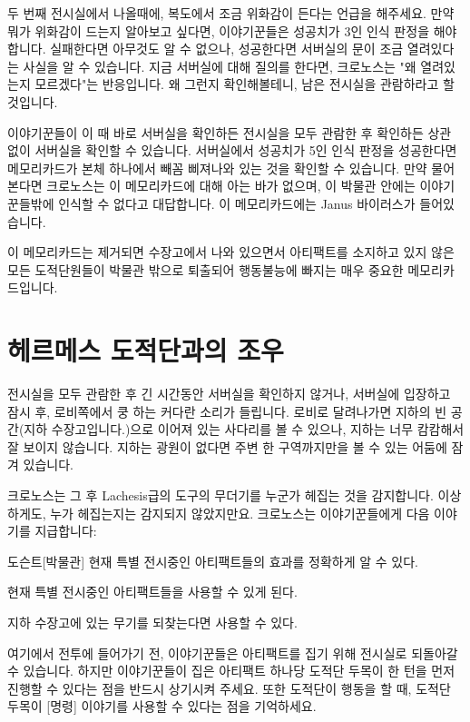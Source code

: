 \documentclass{report}
\begin{document}
	두 번째 전시실에서 나올때에, 복도에서 조금 위화감이 든다는 언급을 해주세요. 만약 뭐가 위화감이 드는지 알아보고 싶다면, 이야기꾼들은 성공치가 3인 인식 판정을 해야합니다. 실패한다면 아무것도 알 수 없으나, 성공한다면 서버실의 문이 조금 열려있다는 사실을 알 수 있습니다. 지금 서버실에 대해 질의를 한다면, 크로노스는 "왜 열려있는지 모르겠다"는 반응입니다. 왜 그런지 확인해볼테니, 남은 전시실을 관람하라고 할 것입니다.
	
	이야기꾼들이 이 때 바로 서버실을 확인하든 전시실을 모두 관람한 후 확인하든 상관 없이 서버실을 확인할 수 있습니다. 서버실에서 성공치가 5인 인식 판정을 성공한다면 메모리카드가 본체 하나에서 빼꼼 삐져나와 있는 것을 확인할 수 있습니다. 만약 물어본다면 크로노스는 이 메모리카드에 대해 아는 바가 없으며, 이 박물관 안에는 이야기꾼들밖에 인식할 수 없다고 대답합니다. 이 메모리카드에는 Janus 바이러스가 들어있습니다.
	
	이 메모리카드는 제거되면 수장고에서 나와 있으면서 아티팩트를 소지하고 있지 않은 모든 도적단원들이 박물관 밖으로 퇴출되어 행동불능에 빠지는 매우 중요한 메모리카드입니다.
	
	\section*{헤르메스 도적단과의 조우}
	전시실을 모두 관람한 후 긴 시간동안 서버실을 확인하지 않거나, 서버실에 입장하고 잠시 후, 로비쪽에서 쿵 하는 커다란 소리가 들립니다. 로비로 달려나가면 지하의 빈 공간(지하 수장고입니다.)으로 이어져 있는 사다리를 볼 수 있으나, 지하는 너무 캄캄해서 잘 보이지 않습니다. 지하는 광원이 없다면 주변 한 구역까지만을 볼 수 있는 어둠에 잠겨 있습니다.
	
	크로노스는 그 후 Lachesis급의 도구의 무더기를 누군가 헤집는 것을 감지합니다. 이상하게도, 누가 헤집는지는 감지되지 않았지만요. 크로노스는 이야기꾼들에게 다음 이야기를 지급합니다:
	\begin{spoiler}{도슨트}{[박물관]}
		현재 특별 전시중인 아티팩트들의 효과를 정확하게 알 수 있다.
		
		현재 특별 전시중인 아티팩트들을 사용할 수 있게 된다.
		
		지하 수장고에 있는 무기를 되찾는다면 사용할 수 있다.
	\end{spoiler}
	여기에서 전투에 들어가기 전, 이야기꾼들은 아티팩트를 집기 위해 전시실로 되돌아갈 수 있습니다. 하지만 이야기꾼들이 집은 아티팩트 하나당 도적단 두목이 한 턴을 먼저 진행할 수 있다는 점을 반드시 상기시켜 주세요. 또한 도적단이 행동을 할 때, 도적단 두목이 [명령] 이야기를 사용할 수 있다는 점을 기억하세요.
	
\end{document}

